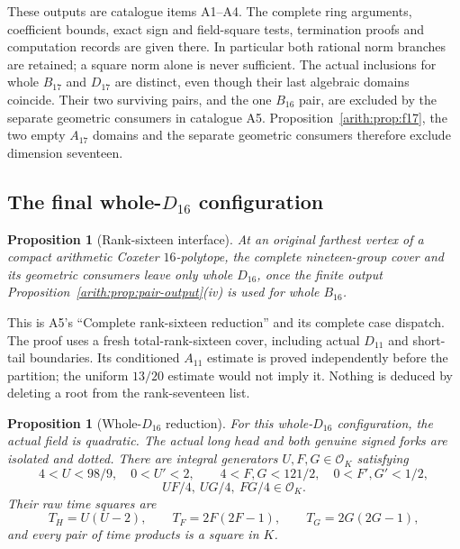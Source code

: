 \documentclass[11pt]{article}
\newtheorem{proposition}[theorem]{Proposition}
\theoremstyle{remark}\newtheorem{remark}[theorem]{Remark}
\numberwithin{equation}{section}
\newcommand{\OK}{\mathcal O_K}
\begin{document}
These outputs are catalogue items A1--A4. The complete ring arguments,
coefficient bounds, exact sign and field-square tests, termination proofs
and computation records are given there. In particular both rational norm
branches are retained; a square norm alone is never sufficient.
The actual inclusions for whole $B_{17}$ and $D_{17}$ are distinct,
even though their last algebraic domains coincide. Their two surviving
pairs, and the one $B_{16}$ pair, are excluded by the separate geometric
consumers in catalogue A5. Proposition~\ref{arith:prop:f17}, the two empty $A_{17}$ domains and
the separate geometric consumers therefore exclude dimension seventeen.



\subsection[The final whole-D16 configuration]{The final whole-$D_{16}$ configuration}
\label{arith:sec:sixteen}\label{arith:sec:d16}
\begin{proposition}[Rank-sixteen interface]\label{arith:prop:f16}
At an original farthest vertex of a compact arithmetic Coxeter
$16$-polytope, the complete nineteen-group cover and its geometric
consumers leave only whole $D_{16}$, once the finite output
Proposition~\ref{arith:prop:pair-output}(iv) is used for whole $B_{16}$.
\end{proposition}
This is A5's ``Complete rank-sixteen reduction'' and its complete case
dispatch. The proof uses a fresh total-rank-sixteen cover, including
actual $D_{11}$ and short-tail boundaries. Its conditioned $A_{11}$
estimate is proved independently before the partition; the uniform
$13/20$ estimate would not imply it. Nothing is deduced by deleting a
root from the rank-seventeen list.

\begin{proposition}[Whole-$D_{16}$ reduction]\label{prop:d16reduce}
For this whole-$D_{16}$ configuration, the actual field is quadratic. The actual long
head and both genuine signed forks are isolated and dotted. There
are integral generators $U,F,G\in\OK$ satisfying
 \begin{equation}\label{eq:d16strips}
 4<U<98/9,\quad0<U'<2,\qquad
 4<F,G<121/2,\quad0<F',G'<1/2,
\end{equation}
\begin{equation}\label{eq:quarters}
 UF/4,\ UG/4,\ FG/4\in\OK.
\end{equation}
Their raw time squares are
 \begin{equation}\label{eq:times}
 T_H=U(U-2),\qquad T_F=2F(2F-1),\qquad T_G=2G(2G-1),
\end{equation}
and every pair of time products is a square in $K$.
\end{proposition}
\end{document}
